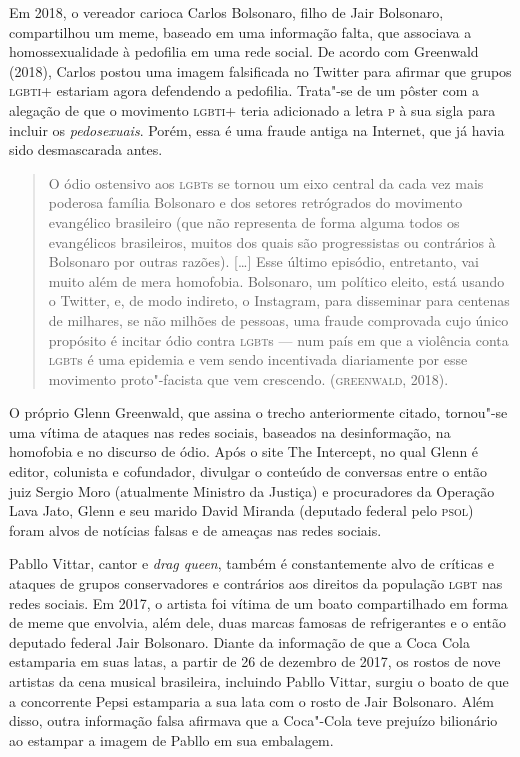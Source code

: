 Em 2018, o vereador carioca Carlos Bolsonaro, filho de Jair Bolsonaro,
compartilhou um meme, baseado em uma informação falta, que associava a
homossexualidade à pedofilia em uma rede social. De acordo com Greenwald
(2018), Carlos postou uma imagem falsificada no Twitter para afirmar que
grupos \textsc{lgbti}+ estariam agora defendendo a pedofilia. Trata"-se de um
pôster com a alegação de que o movimento \textsc{lgbti}+ teria adicionado a letra
\textsc{p} à sua sigla para incluir os \textit{pedosexuais}. Porém, essa é uma
fraude antiga na Internet, que já havia sido desmascarada antes.

\begin{quote}
O ódio ostensivo aos \textsc{lgbt}s se tornou um eixo central da cada vez mais
poderosa família Bolsonaro e dos setores retrógrados do movimento
evangélico brasileiro (que não representa de forma alguma todos os
evangélicos brasileiros, muitos dos quais são progressistas ou
contrários à Bolsonaro por outras razões). {[}\ldots{}{]} Esse último
episódio, entretanto, vai muito além de mera homofobia. Bolsonaro, um
político eleito, está usando o Twitter, e, de modo indireto, o
Instagram, para disseminar para centenas de milhares, se não milhões de
pessoas, uma fraude comprovada cujo único propósito é incitar ódio
contra \textsc{lgbt}s --- num país em que a violência conta \textsc{lgbt}s é uma epidemia e
vem sendo incentivada diariamente por esse movimento proto"-facista que
vem crescendo. (\textsc{greenwald}, 2018).
\end{quote}

O próprio Glenn Greenwald, que assina o trecho anteriormente citado,
tornou"-se uma vítima de ataques nas redes sociais, baseados na
desinformação, na homofobia e no discurso de ódio. Após o site The
Intercept, no qual Glenn é editor, colunista e cofundador, divulgar o
conteúdo de conversas entre o então juiz Sergio Moro (atualmente
Ministro da Justiça) e procuradores da Operação Lava Jato, Glenn e seu
marido David Miranda (deputado federal pelo \textsc{psol}) foram alvos de
notícias falsas e de ameaças nas redes sociais.

Pabllo Vittar, cantor e \textit{drag queen}, também é constantemente alvo
de críticas e ataques de grupos conservadores e contrários aos direitos
da população \textsc{lgbt} nas redes sociais. Em 2017, o artista foi vítima de um
boato compartilhado em forma de meme que envolvia, além dele, duas
marcas famosas de refrigerantes e o então deputado federal Jair
Bolsonaro. Diante da informação de que a Coca Cola estamparia em suas
latas, a partir de 26 de dezembro de 2017, os rostos de nove artistas da
cena musical brasileira, incluindo Pabllo Vittar, surgiu o boato de que
a concorrente Pepsi estamparia a sua lata com o rosto de Jair Bolsonaro.
Além disso, outra informação falsa afirmava que a Coca"-Cola
teve prejuízo bilionário ao estampar a imagem de Pabllo em sua
embalagem.

